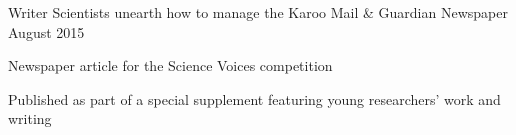


\begin{cventries}


\cventry
{Writer} %
{Scientists unearth how to manage the Karoo} %
{Mail \& Guardian Newspaper} %
{August 2015} %
{ %
\begin{cvitems}
\item {Newspaper article for the Science Voices competition}
\item{Published as part of a special supplement featuring young researchers' work and writing}
\end{cvitems}
}


\end{cventries}
